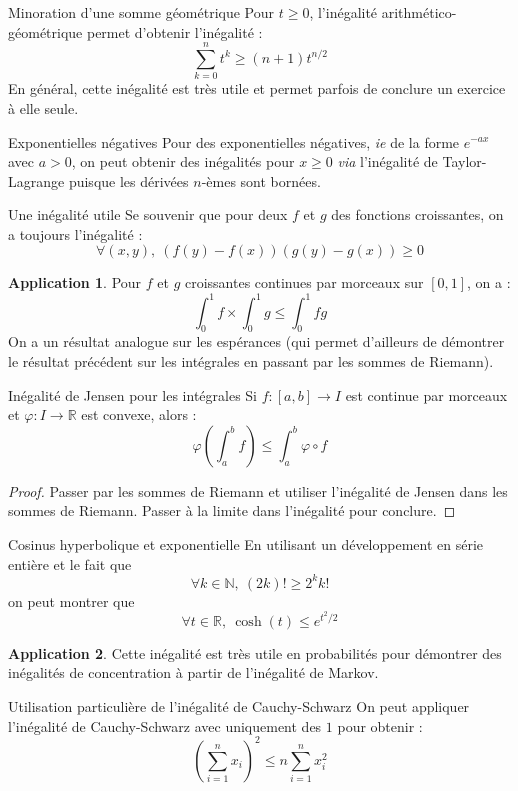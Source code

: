 \documentclass[french]{article}
\newcommand{\N}{\mathbb{N}}
\newcommand{\R}{\mathbb{R}}
\theoremstyle{definition}
\newtheorem*{app}{Application}
\begin{document}
\begin{lem}{Minoration d'une somme géométrique} Pour $t\geqslant0$, l'inégalité arithmético-géométrique permet d'obtenir l'inégalité : $$\sum_{k=0}^{n}t^k\geqslant(n+1)t^{n/2}$$ En général, cette inégalité est très utile et permet parfois de conclure un exercice à elle seule.
\end{lem}

\begin{lem}{Exponentielles négatives} Pour des exponentielles négatives, \textit{ie} de la forme $e^{-ax}$ avec $a>0$, on peut obtenir des inégalités pour $x\geqslant0$ \textit{via} l'inégalité de Taylor-Lagrange puisque les dérivées $n$-èmes sont bornées.
\end{lem}

\begin{lem}{Une inégalité utile} Se souvenir que pour deux $f$ et $g$ des fonctions croissantes, on a toujours l'inégalité : $$\forall (x,y),\ (f(y)-f(x))(g(y)-g(x))\geqslant0$$
\end{lem}
\begin{app}
	Pour $f$ et $g$ croissantes continues par morceaux sur $[0,1]$, on a : $$\int_{0}^{1}f\times \int_{0}^{1}g\leqslant \int_{0}^{1}fg$$
	On a un résultat analogue sur les espérances (qui permet d'ailleurs de démontrer le résultat précédent sur les intégrales en passant par les sommes de Riemann).
\end{app}

\begin{lem}{Inégalité de Jensen pour les intégrales} Si $f:[a,b]\rightarrow I$ est continue par morceaux et $\varphi:I\rightarrow\R$ est convexe, alors : $$\varphi\left(\int_{a}^{b}f\right)\leqslant\int_{a}^{b}\varphi\circ f$$
\end{lem}
\begin{proof}
	Passer par les sommes de Riemann et utiliser l'inégalité de Jensen dans les sommes de Riemann. Passer à la limite dans l'inégalité pour conclure.
\end{proof}
\begin{lem}{Cosinus hyperbolique et exponentielle} En utilisant un développement en série entière et le fait que $$\forall k\in\N,\ (2k)!\geqslant2^kk!$$ on peut montrer que $$\forall t\in\R,\ \cosh(t)\leqslant e^{t^2/2}$$
\end{lem}
\begin{app}
	Cette inégalité est très utile en probabilités pour démontrer des inégalités de concentration à partir de l'inégalité de Markov.
\end{app}
\begin{lem}{Utilisation particulière de l'inégalité de Cauchy-Schwarz} On peut appliquer l'inégalité de Cauchy-Schwarz avec uniquement des $1$ pour obtenir : $$\left(\sum_{i=1}^{n}x_i\right)^2\leqslant n\sum_{i=1}^{n}x_i^2$$
\end{lem}
\end{document}
